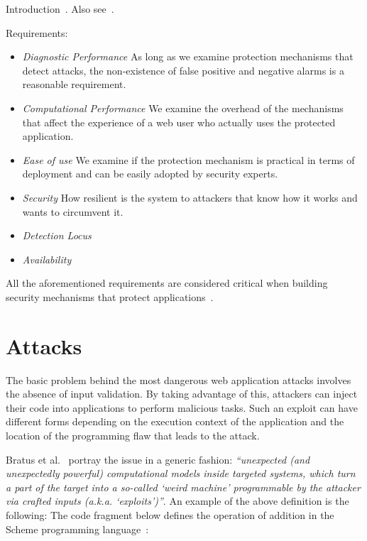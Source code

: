 \documentclass[conference]{IEEEtran}
\begin{document}

Introduction~\cite{I05}. Also see~\cite{A00}.

Requirements:
\begin{itemize}
\item {\it Diagnostic Performance} As long
as we examine protection mechanisms that detect
attacks, the non-existence of false positive and
negative alarms is a reasonable requirement.
\item {\it Computational Performance} We examine
the overhead of the mechanisms
that affect the experience of a web user who actually
uses the protected application.
\item {\it Ease of use} We examine if the protection
mechanism is practical in terms of deployment
and can be easily adopted by security experts.
\item {\it Security} How resilient is the system to
attackers that know how it works and wants to circumvent it.
\item {\it Detection Locus}
\item {\it Availability}
\end{itemize}

All the aforementioned requirements are considered critical
when building security mechanisms that protect
applications~\cite{A01,A00}.

\section{Attacks}
\label{sec:attacks}

The basic problem behind the most dangerous
web application attacks involves
the absence of input validation. By taking advantage of
this, attackers can inject their code into
applications to perform malicious tasks. Such
an exploit can have different forms depending on the
execution context of the application and the location
of the programming flaw that leads to the attack.

Bratus et al.~\cite{BLSPS11} portray the issue in a generic fashion:
{\it ``unexpected (and unexpectedly powerful) computational models
inside targeted systems, which turn a part of the target into a
so-called `weird machine' programmable by the attacker via crafted inputs
(a.k.a. `exploits')''}.
An example of the above definition is the
following: The code fragment below defines the operation of
addition in the Scheme programming language~\cite{AS96,D09}:
\end{document}
